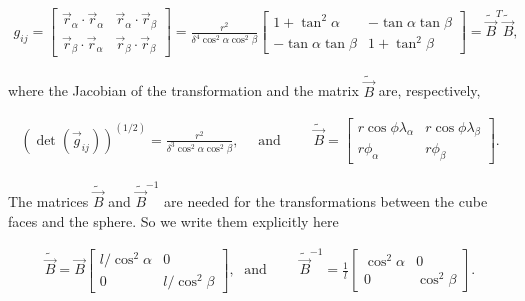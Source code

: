\documentclass{report}
\begin{document}
\begin{align}
    g_{ij} =
    \left[ 
        \begin{array}{cc}
             \vec{r}_{\alpha} \cdot \vec{r}_{\alpha} & \vec{r}_{\alpha} \cdot \vec{r}_{\beta} \\
             \vec{r}_{\beta} \cdot \vec{r}_{\alpha} & \vec{r}_{\beta} \cdot \vec{r}_{\beta}
        \end{array}
    \right] =
    \frac{r^2}{\delta^4 \cos^2 \alpha \cos^2 \beta}
    \left[ 
        \begin{array}{cc}
             1 + \tan^2 \alpha        & - \tan \alpha \tan \beta \\
             - \tan \alpha \tan \beta & 1 + \tan^2 \beta 
        \end{array}
    \right] = \widetilde{\vec{B}}^T \widetilde{\vec{B}},
\end{align}

\noindent where the Jacobian of the transformation and the matrix $\widetilde{\vec{B}}$ are, respectively,

\begin{align}
    (\det(\vec{g}_{ij}))^{(1/2)} =
    \frac{r^2}{\delta^3 \cos^2 \alpha \cos^2 \beta},  \quad \textrm{ and } \qquad
    \widetilde{\vec B}=
    \left[ 
        \begin{array}{cc}
             r \cos \phi \lambda_{\alpha}   & r \cos \phi \lambda_{\beta} \\
             r \phi_{\alpha}                & r \phi_{\beta}  
        \end{array}
    \right] .
\end{align}

\noindent The matrices $\widetilde{\vec{B}}$ and $\widetilde{\vec B}^{-1}$ are needed for the transformations between the cube faces and the sphere. So we write them explicitly here

\begin{align}
    \widetilde{\vec{B}} = \vec{B}
    \left[ 
        \begin{array}{cc}
             l / \cos^2{\alpha}   & 0 \\
             0                    & l/ \cos^2{\beta}  
        \end{array}
    \right] , \; \textrm{ and } \qquad
    \widetilde{\vec B}^{-1} =
    \frac{1}{l}
    \left[ 
        \begin{array}{cc}
             \cos^2{\alpha}  & 0 \\
             0               & \cos^2{\beta}  
        \end{array}
    \right] .
\end{align}
\end{document}
